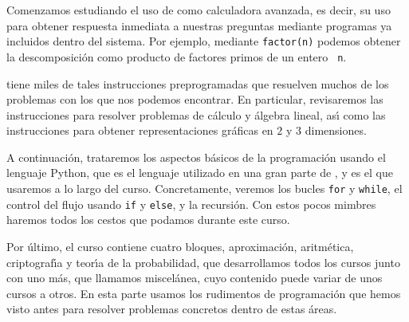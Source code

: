 Comenzamos estudiando el uso de {\sage} como calculadora avanzada, es decir, su
uso
para obtener respuesta inmediata a nuestras preguntas mediante programas ya
incluidos dentro del sistema. Por ejemplo, mediante {\tt factor(n)} podemos
obtener la descomposici\'on como producto de factores primos de un entero {\tt
n}. 

{\sage} tiene miles de tales instrucciones preprogramadas que resuelven muchos
de
los problemas con los que nos podemos encontrar. En particular, revisaremos las
instrucciones para resolver problemas de c\'alculo y \'algebra lineal, as\'{\i}
como las instrucciones para obtener representaciones gr\'aficas en $2$ y $3$
dimensiones.


A continuaci\'on, trataremos los aspectos b\'asicos de la programaci\'on usando
el lenguaje Python, que es el lenguaje utilizado en una gran parte de
{\sage}, y es el que usaremos a lo largo del curso.
Concretamente, veremos los bucles {\tt for} y {\tt while}, el control del flujo
usando {\tt if} y {\tt else}, y la recursi\'on. Con estos pocos mimbres haremos
todos los cestos que podamos durante este curso. 

Por \'ultimo, el curso contiene cuatro  bloques, aproximaci\'on, aritm\'etica,
criptograf\'{\i}a y
teor\'{\i}a de la probabilidad, que desarrollamos todos los cursos junto con uno
m\'as, que llamamos miscel\'anea, cuyo contenido puede variar de unos cursos a
otros. En esta parte usamos los rudimentos de programaci\'on que hemos visto
antes para resolver problemas concretos dentro de estas \'areas. 

